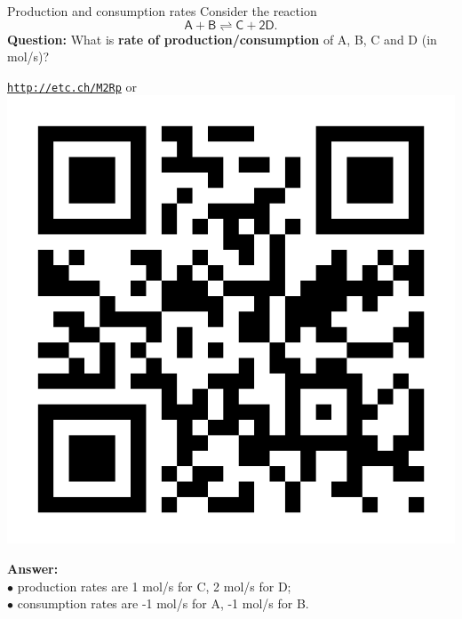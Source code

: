 \begin{frame}{Production and consumption rates}
	\vskip 10pt
Consider the reaction
	\[
	\mathsf{A+B\rightleftharpoons C+2D.}
	\]
%
\alert{\textbf{Question:}}  What is \textbf{rate of production\slash consumption}
of A, B, C and D (in mol/s)? \\
\begin{center}{ \href{http://etc.ch/M2Rp}{\textcolor{indigo(dye)}{\tt http://etc.ch/M2Rp}}} \quad
or \quad
\includegraphics[height=0.25\columnwidth]{figures/intro/poll-python-background.png}
\end{center}
\hiddenpause
\textbf{Answer:} \\
\qquad $\bullet$ production rates are 1 mol/s for C, 2 mol/s for D; \\
\qquad $\bullet$ consumption rates are -1 mol/s for A, -1 mol/s for B. 
\end{frame}
%
